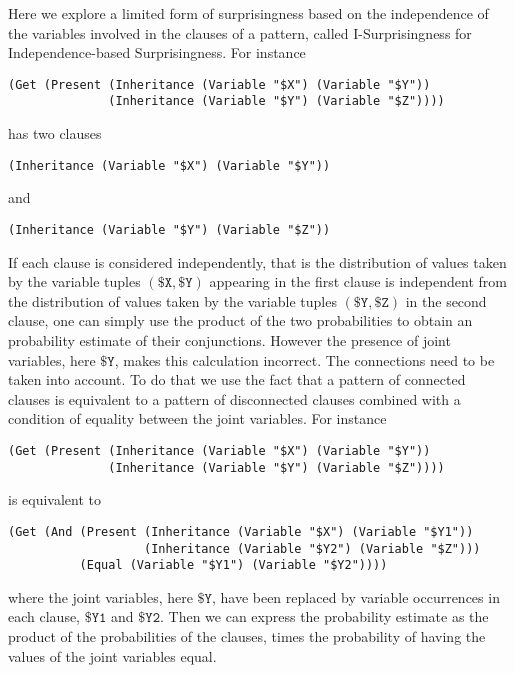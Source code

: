 \documentclass[runningheads]{llncs}
\begin{document}
Here we explore a limited form of surprisingness based on the
independence of the variables involved in the clauses of a pattern,
called I-Surprisingness for Independence-based Surprisingness. For
instance
\begin{verbatim}
(Get (Present (Inheritance (Variable "$X") (Variable "$Y"))
              (Inheritance (Variable "$Y") (Variable "$Z"))))
\end{verbatim}
has two clauses
\begin{verbatim}
(Inheritance (Variable "$X") (Variable "$Y"))
\end{verbatim}
and
\begin{verbatim}
(Inheritance (Variable "$Y") (Variable "$Z"))
\end{verbatim}
If each clause is considered independently, that is the distribution
of values taken by the variable tuples $(\texttt{\$X}, \texttt{\$Y})$
appearing in the first clause is independent from the distribution of
values taken by the variable tuples $(\texttt{\$Y}, \texttt{\$Z})$ in
the second clause, one can simply use the product of the two
probabilities to obtain an probability estimate of their
conjunctions. However the presence of joint variables, here
$\texttt{\$Y}$, makes this calculation incorrect. The connections need
to be taken into account. To do that we use the fact that a pattern of
connected clauses is equivalent to a pattern of disconnected clauses
combined with a condition of equality between the joint variables. For
instance
\begin{verbatim}
(Get (Present (Inheritance (Variable "$X") (Variable "$Y"))
              (Inheritance (Variable "$Y") (Variable "$Z"))))
\end{verbatim}
is equivalent to
\begin{verbatim}
(Get (And (Present (Inheritance (Variable "$X") (Variable "$Y1"))
                   (Inheritance (Variable "$Y2") (Variable "$Z")))
          (Equal (Variable "$Y1") (Variable "$Y2"))))
\end{verbatim}
where the joint variables, here $\texttt{\$Y}$, have been replaced by
variable occurrences in each clause, $\texttt{\$Y1}$ and
$\texttt{\$Y2}$.
Then we can express the probability estimate as the product of the
probabilities of the clauses,
times the
probability of having the values of the joint variables equal.
\end{document}
